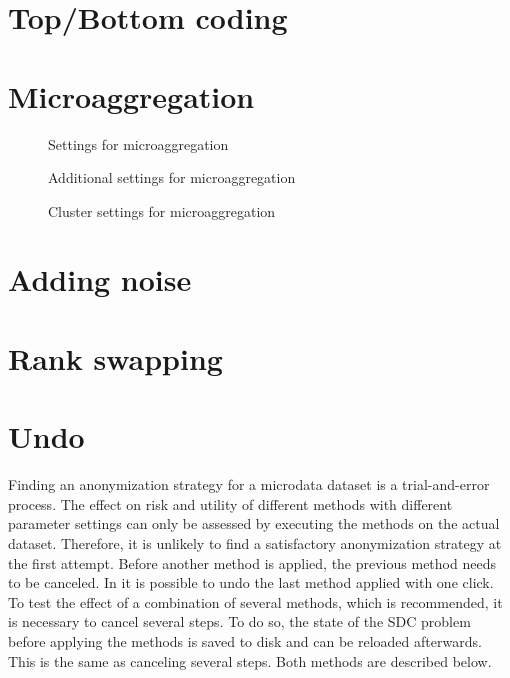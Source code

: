 \documentclass[letterpaper,10pt,english]{sphinxmanual}
\begin{document}
\section{Top/Bottom coding}
\label{\detokenize{anon:top-bottom-coding}}

\section{Microaggregation}
\label{\detokenize{anon:microaggregation}}
\begin{figure}[htbp]
\centering
\capstart

\noindent{}
\caption{Settings for microaggregation}\label{\detokenize{anon:fig89}}\label{\detokenize{anon:id9}}\end{figure}

\begin{figure}[htbp]
\centering
\capstart

\noindent{}
\caption{Additional settings for microaggregation}\label{\detokenize{anon:fig810}}\label{\detokenize{anon:id10}}\end{figure}

\begin{figure}[htbp]
\centering
\capstart

\noindent{}
\caption{Cluster settings for microaggregation}\label{\detokenize{anon:fig811}}\label{\detokenize{anon:id11}}\end{figure}


\section{Adding noise}
\label{\detokenize{anon:adding-noise}}

\section{Rank swapping}
\label{\detokenize{anon:rank-swapping}}

\section{Undo}
\label{\detokenize{anon:undo}}
Finding an anonymization strategy for a microdata dataset is a trial-and-error process.
The effect on risk and utility of different methods with different parameter settings can
only be assessed by executing the methods on the actual dataset. Therefore, it is unlikely
to find a satisfactory anonymization strategy at the first attempt. Before another method
is applied, the previous method needs to be canceled. In  it is possible
to undo the last method applied with one click. To test the effect of a combination
of several methods, which is recommended, it is necessary to cancel several steps.
To do so, the state of the SDC problem before applying the methods is saved to disk and can
be reloaded afterwards. This is the same as canceling several steps. Both methods are
described below.
\end{document}
